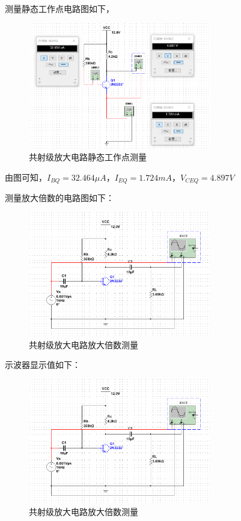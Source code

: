 \documentclass[10pt, conference, compsocconf, a4paper]{IEEEtran}
\begin{document}
测量静态工作点电路图如下，\par
\begin{figure}[h]
  \includegraphics[width=8cm]{img/a.png}
  \caption{共射级放大电路静态工作点测量}
\end{figure}
由图可知，$I_{BQ}=32.464\mu A，I_{EQ}=1.724mA，V_{CEQ}=4.897V$

测量放大倍数的电路图如下：\par

\begin{figure}[h]
  \includegraphics[width=8cm]{img/b.png}
  \caption{共射级放大电路放大倍数测量}
\end{figure}

示波器显示值如下：\par

\begin{figure}[h]
  \includegraphics[width=8cm]{img/b.png}
  \caption{共射级放大电路放大倍数测量}
\end{figure}
\end{document}
